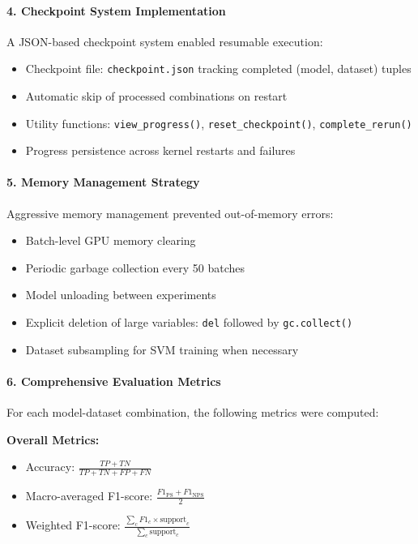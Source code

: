 \documentclass[11pt, titlepage, bibliography=totoc]{scrreprt}
\begin{document}
\paragraph{4. Checkpoint System Implementation}
A JSON-based checkpoint system enabled resumable execution:
\begin{itemize}
    \item Checkpoint file: \texttt{checkpoint.json} tracking completed (model, dataset) tuples
    \item Automatic skip of processed combinations on restart
    \item Utility functions: \texttt{view\_progress()}, \texttt{reset\_checkpoint()}, \texttt{complete\_rerun()}
    \item Progress persistence across kernel restarts and failures
\end{itemize}

\paragraph{5. Memory Management Strategy}
Aggressive memory management prevented out-of-memory errors:
\begin{itemize}
    \item Batch-level GPU memory clearing
    \item Periodic garbage collection every 50 batches
    \item Model unloading between experiments
    \item Explicit deletion of large variables: \texttt{del} followed by \texttt{gc.collect()}
    \item Dataset subsampling for SVM training when necessary
\end{itemize}

\paragraph{6. Comprehensive Evaluation Metrics}
For each model-dataset combination, the following metrics were computed:

\textbf{Overall Metrics:}
\begin{itemize}
    \item Accuracy: $\frac{TP + TN}{TP + TN + FP + FN}$
    \item Macro-averaged F1-score: $\frac{F1_{\text{PS}} + F1_{\text{NPS}}}{2}$
    \item Weighted F1-score: $\frac{\sum_{c} F1_c \times \text{support}_c}{\sum_{c} \text{support}_c}$
\end{itemize}
\end{document}
